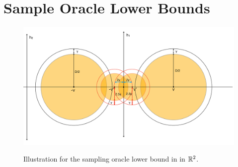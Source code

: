 \section{Sample Oracle Lower Bounds}\label{app: lower bound}
\begin{figure}[h!]
\centering
		\includegraphics[width=.6\linewidth]{icml1.pdf}
		\label{fig:LB}
   \caption{Illustration for the sampling oracle lower bound in  in $\mathbb{R}^2$.}
	\label{fig:illustration}
\end{figure}


